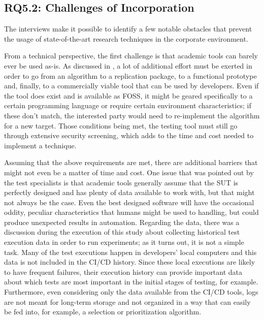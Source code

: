 \subsection{RQ5.2: Challenges of Incorporation}
\label{sec:ind_rq2}

The interviews make it possible to identify a few notable obstacles that prevent the usage of state-of-the-art research techniques in the corporate environment.

From a technical perspective, the first challenge is that academic tools can barely ever be used as-is.
As discussed in , a lot of additional effort must be exerted in order to go from an algorithm to a replication package, to a functional prototype and, finally, to a commercially viable tool that can be used by developers.
Even if the tool does exist and is available as FOSS, it might be geared specifically to a certain programming language or require certain environment characteristics; if these don't match, the interested party would need to re-implement the algorithm for a new target.
Those conditions being met, the testing tool must still go through extensive security screening, which adds to the time and cost needed to implement a technique.

Assuming that the above requirements are met, there are additional barriers that might not even be a matter of time and cost.
One issue that was pointed out by the test specialists is that academic tools generally assume that the SUT is perfectly designed and has plenty of data available to work with, but that might not always be the case.
Even the best designed software will have the occasional oddity, peculiar characteristics that humans might be used to handling, but could produce unexpected results in automation.
Regarding the data, there was a discussion during the execution of this study about collecting historical test execution data in order to run experiments; as it turns out, it is not a simple task.
Many of the test executions happen in developers' local computers and this data is not included in the CI/CD history.
Since these local executions are likely to have frequent failures, their execution history can provide important data about which tests are most important in the initial stages of testing, for example.
Furthermore, even considering only the data available from the CI/CD tools, logs are not meant for long-term storage and not organized in a way that can easily be fed into, for example, a selection or prioritization algorithm.

